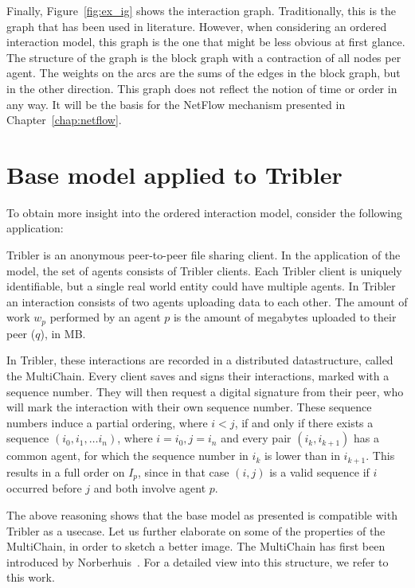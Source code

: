 \documentclass[a4paper,11pt]{book}
\theoremstyle{definition}
\begin{document}
Finally, Figure~\ref{fig:ex_ig} shows the interaction graph. Traditionally, this is the graph
that has been used in literature. However, when considering an ordered interaction model, this
graph is the one that might be less obvious at first glance. The structure of the graph
is the block graph with a contraction of all nodes per agent. The weights on the arcs are
the sums of the edges in the block graph, but in the other direction. This graph does
not reflect the notion of time or order in any way. It will be the basis for the
NetFlow mechanism presented in Chapter~\ref{chap:netflow}.



\section{Base model applied to Tribler}

To obtain more insight into the ordered interaction model, consider the following application:

Tribler is an anonymous peer-to-peer file sharing client. In the application of the model,
the set of agents consists of Tribler clients. Each Tribler client is uniquely identifiable,
but a single real world entity could have multiple agents. In Tribler an interaction
consists of two agents uploading data to each other. The amount of work $w_p$ performed
by an agent $p$ is the amount of megabytes uploaded to their peer ($q$), in MB.

In Tribler, these interactions are recorded in a distributed datastructure, called the MultiChain.
Every client saves and signs their interactions, marked with a sequence number. They will then request
a digital signature from their peer, who will mark the interaction with their own sequence number.
These sequence numbers induce a partial ordering, where $i < j$, if and only if there exists
a sequence $(i_0, i_1, \ldots i_n)$, where $i=i_0, j=i_n$ and every pair $(i_k, i_{k+1})$ has
a common agent, for which the sequence number in $i_k$ is lower than in $i_{k+1}$.
This results in a full order on $I_p$, since in that case $(i, j)$ is a valid sequence if
$i$ occurred before $j$ and both involve agent $p$.

The above reasoning shows that the base model as presented is compatible with Tribler as a usecase.
Let us further elaborate on some of the properties of the MultiChain, in order to sketch a better image.
The MultiChain has first been introduced by Norberhuis~\cite{norberhuis2015multichain}. For a detailed
view into this structure, we refer to this work.
\end{document}
